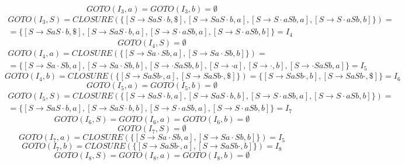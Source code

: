 \documentclass[11pt]{article}
\begin{document}
\begin{equation*}
GOTO(I_3, a) = GOTO(I_3, b) = \emptyset
\end{equation*}
\begin{multline*}
GOTO(I_3, S) = CLOSURE(\{[S \rightarrow SaS\cdot b, \$], [S \rightarrow SaS\cdot b, a],
[S \rightarrow S\cdot aSb, a], [S \rightarrow S\cdot aSb, b]\}) = \\
= \{[S \rightarrow SaS\cdot b, \$], [S \rightarrow SaS\cdot b, a],
[S \rightarrow S\cdot aSb, a], [S \rightarrow S\cdot aSb, b]\} = I_4
\end{multline*}
\begin{equation*}
GOTO(I_4, S) = \emptyset
\end{equation*}
\begin{multline*}
GOTO(I_4, a) = CLOSURE(\{[S \rightarrow Sa\cdot Sb, a], [S \rightarrow Sa\cdot Sb, b]\}) = \\
= \{[S \rightarrow Sa\cdot Sb, a], [S \rightarrow Sa\cdot Sb, b],
[S \rightarrow \cdot SaSb, b], [S \rightarrow \cdot a], [S \rightarrow \cdot, b],
[S \rightarrow \cdot SaSb, a]\} = I_5
\end{multline*}
\begin{equation*}
GOTO(I_4, b) = CLOSURE(\{[S \rightarrow SaSb\cdot, a], [S \rightarrow SaSb\cdot, \$]\})
= \{[S \rightarrow SaSb\cdot, b], [S \rightarrow SaSb\cdot, \$]\} = I_6
\end{equation*}
\begin{equation*}
GOTO(I_5, a) = GOTO(I_5, b) = \emptyset
\end{equation*}
\begin{multline*}
GOTO(I_5, S) = CLOSURE(\{[S \rightarrow SaS\cdot b, a], [S \rightarrow SaS\cdot b, b],
[S \rightarrow S\cdot aSb, a], [S \rightarrow S\cdot aSb, b]\}) = \\
= \{[S \rightarrow SaS\cdot b, a], [S \rightarrow SaS\cdot b, b],
[S \rightarrow S\cdot aSb, a], [S \rightarrow S\cdot aSb, b]\} = I_7
\end{multline*}
\begin{equation*}
GOTO(I_6, S) = GOTO(I_6, a) = GOTO(I_6, b) = \emptyset
\end{equation*}
\begin{equation*}
GOTO(I_7, S) = \emptyset
\end{equation*}
\begin{equation*}
GOTO(I_7, a) = CLOSURE(\{[S \rightarrow Sa\cdot Sb, a], [S \rightarrow Sa\cdot Sb, b]\}) = I_5
\end{equation*}
\begin{equation*}
GOTO(I_7, b) = CLOSURE(\{[S \rightarrow SaSb\cdot, a], [S \rightarrow SaSb\cdot, b]\}) = I_8
\end{equation*}
\begin{equation*}
GOTO(I_8, S) = GOTO(I_8, a) = GOTO(I_8, b) = \emptyset
\end{equation*}
\end{document}
